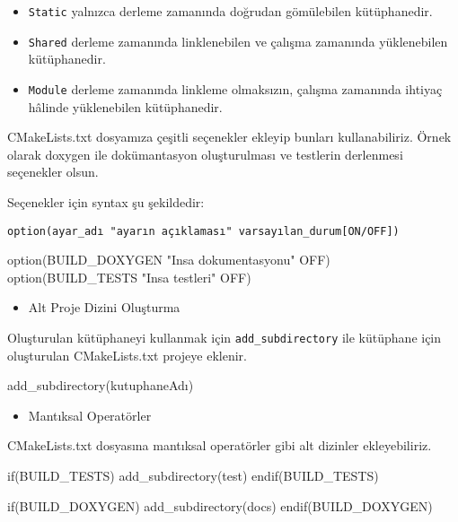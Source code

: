 \documentclass[
]{book}
\newenvironment{Shaded}{\begin{snugshade}}{\end{snugshade}}
\newcommand{\ExtensionTok}[1]{#1}
\newcommand{\NormalTok}[1]{#1}
\newcommand{\StringTok}[1]{\textcolor[rgb]{0.31,0.60,0.02}{#1}}
\providecommand{\tightlist}{%
  \setlength{\itemsep}{0pt}\setlength{\parskip}{0pt}}
\begin{document}
\begin{itemize}
\tightlist
\item
  \texttt{Static} yalnızca derleme zamanında doğrudan gömülebilen kütüphanedir.
\item
  \texttt{Shared} derleme zamanında linklenebilen ve çalışma zamanında yüklenebilen kütüphanedir.
\item
  \texttt{Module} derleme zamanında linkleme olmaksızın, çalışma zamanında ihtiyaç hâlinde yüklenebilen kütüphanedir.
\end{itemize}

CMakeLists.txt dosyamıza çeşitli seçenekler ekleyip bunları kullanabiliriz. Örnek olarak doxygen ile dokümantasyon oluşturulması ve testlerin derlenmesi seçenekler olsun.

Seçenekler için syntax şu şekildedir:

\texttt{option(ayar\_adı\ "ayarın\ açıklaması"\ varsayılan\_durum{[}ON/OFF{]})}

\begin{Shaded}
\begin{Highlighting}[]
   \ExtensionTok{option}\NormalTok{(BUILD\_DOXYGEN }\StringTok{"Insa dokumentasyonu"}\NormalTok{ OFF)}
   \ExtensionTok{option}\NormalTok{(BUILD\_TESTS }\StringTok{"Insa testleri"}\NormalTok{ OFF)}
\end{Highlighting}
\end{Shaded}

\begin{itemize}
\tightlist
\item
  Alt Proje Dizini Oluşturma
\end{itemize}

Oluşturulan kütüphaneyi kullanmak için \texttt{add\_subdirectory} ile kütüphane için oluşturulan CMakeLists.txt projeye eklenir.

\begin{Shaded}
\begin{Highlighting}[]
   \ExtensionTok{add\_subdirectory}\NormalTok{(kutuphaneAdı)}
\end{Highlighting}
\end{Shaded}

\begin{itemize}
\tightlist
\item
  Mantıksal Operatörler
\end{itemize}

CMakeLists.txt dosyasına mantıksal operatörler gibi alt dizinler ekleyebiliriz.

\begin{Shaded}
\begin{Highlighting}[]
  \ExtensionTok{if}\NormalTok{(BUILD\_TESTS)}
    \ExtensionTok{add\_subdirectory}\NormalTok{(test)}
  \ExtensionTok{endif}\NormalTok{(BUILD\_TESTS)}

  \ExtensionTok{if}\NormalTok{(BUILD\_DOXYGEN)}
    \ExtensionTok{add\_subdirectory}\NormalTok{(docs)}
  \ExtensionTok{endif}\NormalTok{(BUILD\_DOXYGEN)}
\end{Highlighting}
\end{Shaded}
\end{document}
